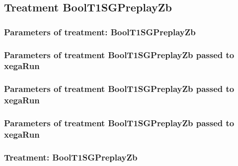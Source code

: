 \documentclass[18pt,c]{beamer}
\begin{document}
\clearpage
\subsection{Treatment BoolT1SGPreplayZb}

 \begin{frame}
 \fontsize{8pt}{9pt}\selectfont
 \frametitle{  Parameters of treatment: BoolT1SGPreplayZb 
 }

 \label{ExpCtParmTable012.tex}  
 \end{frame}


 \begin{frame}
 \fontsize{8pt}{9pt}\selectfont
 \frametitle{  Parameters of treatment BoolT1SGPreplayZb passed to xegaRun
 }

 \label{ExpCtParmTable013.tex}  
 \end{frame}


 \begin{frame}
 \fontsize{8pt}{9pt}\selectfont
 \frametitle{  Parameters of treatment BoolT1SGPreplayZb passed to xegaRun
 }

 \label{ExpCtParmTable014.tex}  
 \end{frame}


 \begin{frame}
 \fontsize{8pt}{9pt}\selectfont
 \frametitle{  Parameters of treatment BoolT1SGPreplayZb passed to xegaRun
 }

 \label{ExpCtParmTable015.tex}  
 \end{frame}

 \begin{frame}
 \fontsize{8pt}{9pt}\selectfont
 \frametitle{ Treatment: BoolT1SGPreplayZb }

 \label{ExpCStatsTable010.tex}  
 \end{frame}
\end{document}
